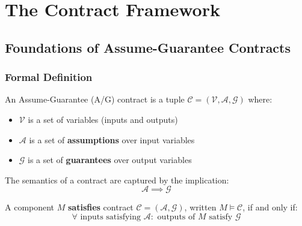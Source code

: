 
\chapter{The Contract Framework}
\label{ch:contracts}


\section{Foundations of Assume-Guarantee Contracts}

\subsection{Formal Definition}

\begin{definition}
\label{def:ag_contract}
An Assume-Guarantee (A/G) contract is a tuple $\mathcal{C} = (\mathcal{V}, \mathcal{A}, \mathcal{G})$ where:
\begin{itemize}
    \item $\mathcal{V}$ is a set of variables (inputs and outputs)
    \item $\mathcal{A}$ is a set of \textbf{assumptions} over input variables
    \item $\mathcal{G}$ is a set of \textbf{guarantees} over output variables
\end{itemize}
\end{definition}

The semantics of a contract are captured by the implication:
\begin{equation}
\boxed{\mathcal{A} \implies \mathcal{G}}
\label{eq:contract_semantics}
\end{equation}

\begin{theorem}
A component $M$ \textbf{satisfies} contract $\mathcal{C} = (\mathcal{A}, \mathcal{G})$, written $M \models \mathcal{C}$, if and only if:
\begin{equation}
\forall \text{ inputs satisfying } \mathcal{A}: \text{ outputs of } M \text{ satisfy } \mathcal{G}
\end{equation}
\end{theorem}

